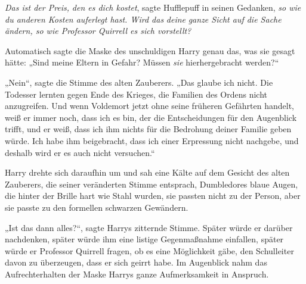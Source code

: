 \emph{Das ist der Preis,} \emph{den es dich kostet}, sagte Hufflepuff in seinen Gedanken, \emph{so wie} \emph{du anderen Kosten auferlegt hast. Wird das} \emph{deine} \emph{ganze Sicht auf die Sache ändern, so wie Professor Quirrell es sich vorstellt?}

Automatisch sagte die Maske des unschuldigen Harry genau das, was sie gesagt hätte:
„Sind meine Eltern in Gefahr? Müssen \emph{sie} hierhergebracht werden?“

„Nein“, sagte die Stimme des alten Zauberers.
„Das glaube ich nicht. Die Todesser lernten gegen Ende des Krieges, die Familien des Ordens nicht anzugreifen. Und wenn Voldemort jetzt ohne seine früheren Gefährten handelt, weiß er immer noch, dass ich es bin, der die Entscheidungen für den Augenblick trifft, und er weiß, dass ich ihm nichts für die Bedrohung deiner Familie geben würde. Ich habe ihm beigebracht, dass ich einer Erpressung nicht nachgebe, und deshalb wird er es auch nicht versuchen.“

Harry drehte sich daraufhin um und sah eine Kälte auf dem Gesicht des alten Zauberers, die seiner veränderten Stimme entsprach, Dumbledores blaue Augen, die hinter der Brille hart wie Stahl wurden, sie passten nicht zu der Person, aber sie passte zu den formellen schwarzen Gewändern.

„Ist das dann alles?“, sagte Harrys zitternde Stimme. Später würde er darüber nachdenken, später würde ihm eine listige Gegenmaßnahme einfallen, später würde er Professor Quirrell fragen, ob es eine Möglichkeit gäbe, den Schulleiter davon zu überzeugen, dass er sich geirrt habe. Im Augenblick nahm das Aufrechterhalten der Maske Harrys ganze Aufmerksamkeit in Anspruch.


